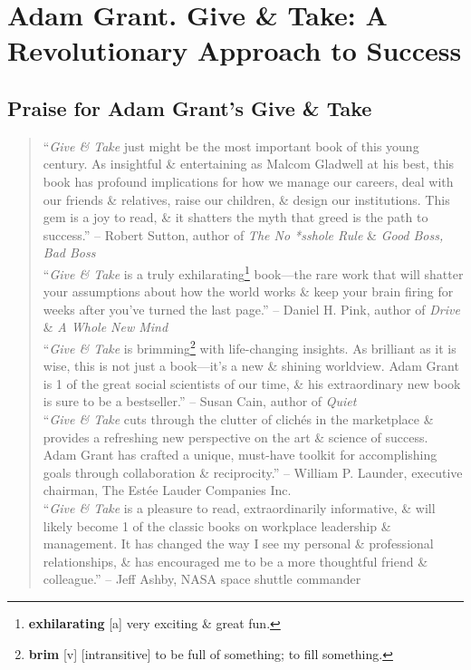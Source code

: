 \documentclass[oneside]{book}
\numberwithin{equation}{section}
\begin{document}

\chapter{Adam Grant. Give \& Take: A Revolutionary Approach to Success}

\section*{Praise for Adam Grant's Give \& Take}
\begin{quotation}
	``\textit{Give \& Take} just might be the most important book of this young century. As insightful \& entertaining as Malcom Gladwell at his best, this book has profound implications for how we manage our careers, deal with our friends \& relatives, raise our children, \& design our institutions. This gem is a joy to read, \& it shatters the myth that greed is the path to success.'' -- Robert Sutton, author of \textit{The No *sshole Rule} \& \textit{Good Boss, Bad Boss}\\
	
	``\textit{Give \& Take} is a truly exhilarating\footnote{\textbf{exhilarating} [a] very exciting \& great fun.} book---the rare work that will shatter your assumptions about how the world works \& keep your brain firing for weeks after you've turned the last page.'' -- Daniel H. Pink, author of \textit{Drive} \& \textit{A Whole New Mind}\\
	
	``\textit{Give \& Take} is brimming\footnote{\textbf{brim} [v] [intransitive] to be full of something; to fill something.} with life-changing insights. As brilliant as it is wise, this is not just a book---it's a new \& shining worldview. Adam Grant is 1 of the great social scientists of our time, \& his extraordinary new book is sure to be a bestseller.'' -- Susan Cain, author of \textit{Quiet}\\
	
	``\textit{Give \& Take} cuts through the clutter of clich\'es in the marketplace \& provides a refreshing new perspective on the art \& science of success. Adam Grant has crafted a unique, must-have toolkit for accomplishing goals through collaboration \& reciprocity.'' -- William P. Launder, executive chairman, The Est\'ee Lauder Companies Inc.\\
	
	``\textit{Give \& Take} is a pleasure to read, extraordinarily informative, \& will likely become 1 of the classic books on workplace leadership \& management. It has changed the way I see my personal \& professional relationships, \& has encouraged me to be a more thoughtful friend \& colleague.'' -- Jeff Ashby, NASA space shuttle commander\\
	

\end{quotation}
\end{document}
